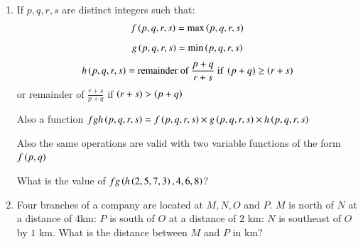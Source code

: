 \documentclass[journal,12pt,onecolumn]{IEEEtran}
\theoremstyle{remark}
\begin{document}
\begin{enumerate}
		\item If $p, q, r, s$ are distinct integers such that:
		$$f\left(p,q,r,s\right) = \max\left(p,q,r,s\right)$$
		$$g\left(p,q,r,s\right) = \min\left(p,q,r,s\right)$$
		$$h\left(p,q,r,s\right) = \text{remainder of } \frac{p+q}{r+s} \text{ if } \left(p+q\right) \geq \left(r+s\right)$$
		or remainder of $\frac{r+s}{p+q}$ if $\left(r+s\right) > \left(p+q\right)$
		
		Also a function $fgh\left(p,q,r,s\right) = f\left(p,q,r,s\right) \times g\left(p,q,r,s\right) \times h\left(p,q,r,s\right)$
		
		Also the same operations are valid with two variable functions of the form $f\left(p,q\right)$
		
		What is the value of $fg\left(h\left(2,5,7,3\right), 4,6,8\right)$?
		
		\hfill{}
		
		\item Four branches of a company are located at $M,N,O$ and $P$. $M$ is north of $N$ at a distance of $4$km: $P$ is south of $O$ at a distance of $2$ km: $N$ is southeast of $O$ by $1$ km. What is the distance between $M$ and $P$ in km?
		
		\hfill{}
		
		\begin{enumerate}
		\end{enumerate}
		
	\end{enumerate}
	\newpage
\end{document}
